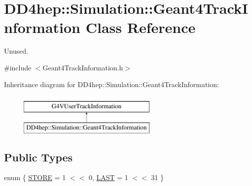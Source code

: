 \hypertarget{class_d_d4hep_1_1_simulation_1_1_geant4_track_information}{}\section{D\+D4hep\+:\+:Simulation\+:\+:Geant4\+Track\+Information Class Reference}
\label{class_d_d4hep_1_1_simulation_1_1_geant4_track_information}


Unused.  




{\ttfamily \#include $<$Geant4\+Track\+Information.\+h$>$}

Inheritance diagram for D\+D4hep\+:\+:Simulation\+:\+:Geant4\+Track\+Information\+:\begin{figure}[H]
\begin{center}
\leavevmode
\includegraphics[height=2.000000cm]{class_d_d4hep_1_1_simulation_1_1_geant4_track_information}
\end{center}
\end{figure}
\subsection*{Public Types}
\begin{DoxyCompactItemize}
\item 
enum \{ \hyperlink{class_d_d4hep_1_1_simulation_1_1_geant4_track_information_afa005d7916d394b13aeaee68fd11eb39ae708756d2130a012dfbf610b5a185013}{S\+T\+O\+RE} = 1 $<$$<$ 0, 
\hyperlink{class_d_d4hep_1_1_simulation_1_1_geant4_track_information_afa005d7916d394b13aeaee68fd11eb39a81ac210b79462efbc46ab716df41e891}{L\+A\+ST} = 1 $<$$<$ 31
 \}
\end{DoxyCompactItemize}
